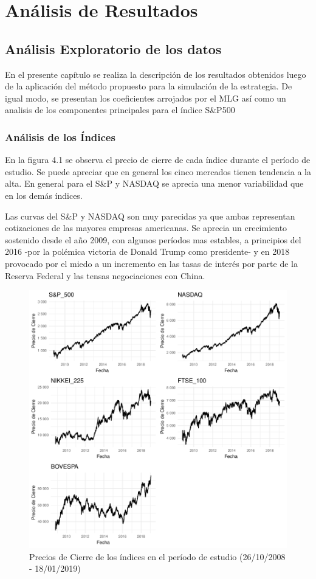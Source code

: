 \documentclass[a4paper,12pt]{Latex/Classes/PhDthesisPSnPDF}
\begin{document}
\chapter{Análisis de Resultados}

\section{Análisis Exploratorio de los datos}

En el presente capítulo se realiza la descripción de los resultados obtenidos luego de la aplicación del método propuesto para la simulación de la estrategia. De igual modo, se presentan los coeficientes arrojados por el MLG así como un analisis de los componentes principales para el índice S\&P500 


\subsection{Análisis de los Índices}

En la figura 4.1 se observa el precio de cierre de cada índice durante el período de estudio. Se puede apreciar que en general los cinco mercados tienen tendencia a la alta. En general para el S\&P y NASDAQ se aprecia una menor variabilidad que en los demás índices.

Las curvas del S\&P y NASDAQ son muy parecidas ya que ambas representan cotizaciones de las mayores empresas americanas. Se aprecia un crecimiento sostenido desde el año 2009, con algunos períodos mas estables, a principios del 2016 -por la polémica victoria de Donald Trump como presidente- y en 2018 provocado por el miedo a un incremento en las tasas de interés por parte de la Reserva Federal y las tensas negociaciones con China.


\begin{figure}[H]
\centering
\includegraphics{main-005}
\caption{Precios de Cierre de los índices en el período de estudio (26/10/2008 - 18/01/2019)}
\end{figure}
\end{document}
